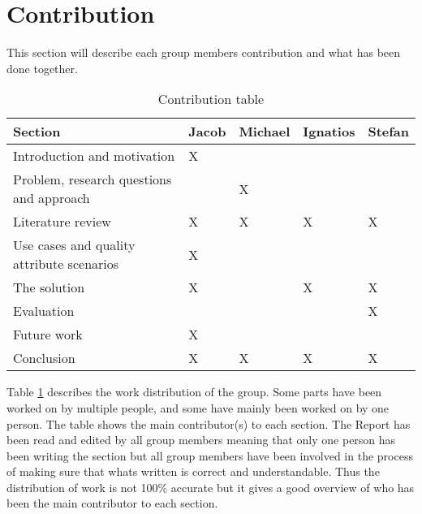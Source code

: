 \documentclass[conference]{IEEEtran}
\begin{document}
\maketitle
\IEEEpubidadjcol


\section{Contribution}
This section will describe each group members contribution and what has been done together.
\begin{table}[h]
    \begin{tabular}{|p{3cm}|p{9mm}|p{9mm}|p{9mm}|p{9mm}|}
        \hline
        \textbf{Section}                          & Jacob & Michael & Ignatios & Stefan \\
        \hline
        Introduction and motivation               & X     &         &          &        \\
        \hline
        Problem, research questions and approach  &       & X       &          &        \\
        \hline
        Literature review                         & X     & X       & X        & X      \\
        \hline
        Use cases and quality attribute scenarios & X     &         &          &        \\
        \hline
        The solution                              & X     &         & X        & X      \\
        \hline
        Evaluation                                &       &         &          & X      \\
        \hline
        Future work                               & X     &         &          &        \\
        \hline
        Conclusion                                & X     & X       & X        & X      \\
        \hline
    \end{tabular}
    \caption{Contribution table}
    \label{tab:contribution-table}
\end{table}

Table \ref{tab:contribution-table} describes the work distribution of the group. Some parts have been worked on by multiple people, and some have mainly been worked on by one person. The table shows the main contributor(s) to each section. The Report has been read and edited by all group members meaning that only one person has been writing the section but all group members have been involved in the process of making sure that whats written is correct and understandable. Thus the distribution of work is not 100\% accurate but it gives a good overview of who has been the main contributor to each section.
\end{document}
